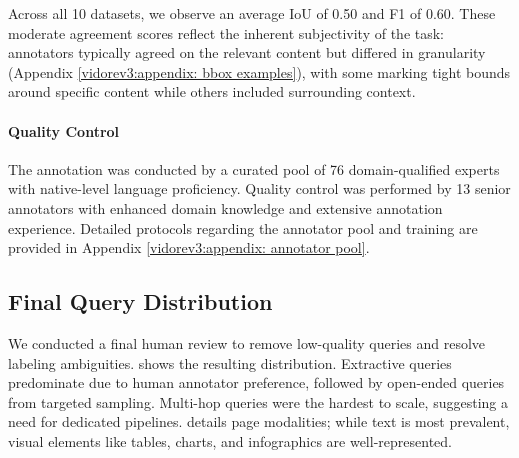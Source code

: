 

Across all 10 datasets, we observe an average IoU of 0.50 and F1 of 0.60. These moderate agreement scores reflect the inherent subjectivity of the task: annotators typically agreed on the relevant content but differed in granularity (Appendix \ref{vidorev3:appendix: bbox examples}), with some marking tight bounds around specific content while others included surrounding context.

\paragraph{Quality Control} The annotation was conducted by a curated pool of 76 domain-qualified experts with native-level language proficiency. Quality control was performed by 13 senior annotators with enhanced domain knowledge and extensive annotation experience. Detailed protocols regarding the annotator pool and training are provided in Appendix \ref{vidorev3:appendix: annotator pool}.

\subsection{Final Query Distribution} 

We conducted a final human review to remove low-quality queries and resolve labeling ambiguities.  shows the resulting distribution. Extractive queries predominate due to human annotator preference, followed by open-ended queries from targeted sampling. Multi-hop queries were the hardest to scale, suggesting a need for dedicated pipelines.  details page modalities; while text is most prevalent, visual elements like tables, charts, and infographics are well-represented.

